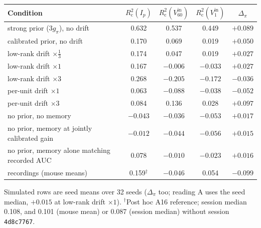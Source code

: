 \documentclass[11pt]{article}
\newcommand{\Rc}{R^2_{\mathrm{c}}}
\begin{document}
\begin{center}
\begin{tabular}{lcccc}
\toprule
Condition & $\Rc(I_p)$ & $\Rc(V^{\mathrm{in}}_{60})$ & $\Rc(V^{\mathrm{in}}_{1})$ & $\Delta_\pi$ \\
\midrule
strong prior ($3g_\pi$), no drift & 0.632 & 0.537 & 0.449 & $+0.089$ \\
calibrated prior, no drift & 0.170 & 0.069 & 0.019 & $+0.050$ \\
low-rank drift $\times\frac13$ & 0.174 & 0.047 & 0.019 & $+0.027$ \\
low-rank drift $\times 1$ & 0.167 & $-0.006$ & $-0.033$ & $+0.027$ \\
low-rank drift $\times 3$ & 0.268 & $-0.205$ & $-0.172$ & $-0.036$ \\
per-unit drift $\times 1$ & 0.063 & $-0.088$ & $-0.038$ & $-0.052$ \\
per-unit drift $\times 3$ & 0.084 & 0.136 & 0.028 & $+0.097$ \\
no prior, no memory & $-0.043$ & $-0.036$ & $-0.053$ & $+0.017$ \\
no prior, memory at jointly calibrated gain & $-0.012$ & $-0.044$ & $-0.056$ & $+0.015$ \\
no prior, memory alone matching recorded AUC & 0.078 & $-0.010$ & $-0.023$ & $+0.016$ \\
\midrule
recordings (mouse means) & 0.159$^\dagger$ & $-0.046$ & 0.054 & $-0.099$ \\
\bottomrule
\end{tabular}
\end{center}
Simulated rows are seed means over 32 seeds ($\Delta_\pi$ too; reading A uses the seed median, $+0.015$ at low-rank
drift $\times 1$). $^\dagger$Post hoc A16 reference; session median 0.108, and 0.101 (mouse mean) or 0.087 (session
median) without session \texttt{4d8c7767}.
\end{document}
